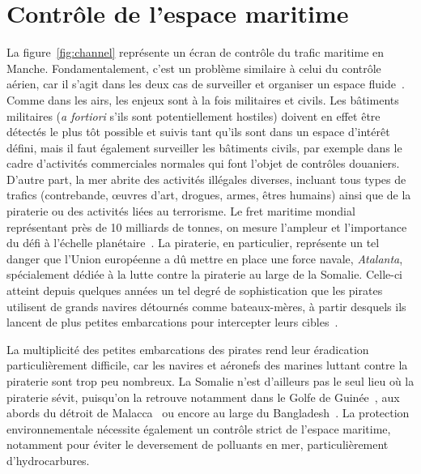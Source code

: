 \section{Contrôle de l'espace maritime}
	La figure~\ref{fig:channel} représente un écran de contrôle du trafic maritime en Manche. Fondamentalement, c'est un problème similaire à celui du contrôle aérien, car il s'agit dans les deux cas de surveiller et organiser un espace fluide~\cite{henninger2012avant, henninger2013fluide}. Comme dans les airs, les enjeux sont à la fois militaires et civils. Les bâtiments militaires (\emph{a fortiori} s'ils sont potentiellement hostiles) doivent en effet être détectés le plus tôt possible et suivis tant qu'ils sont dans un espace d'intérêt défini, mais il faut également surveiller les bâtiments civils, par exemple dans le cadre d'activités commerciales normales qui font l'objet de contrôles douaniers. D'autre part, la mer abrite des activités illégales diverses, incluant tous types de trafics (contrebande, œuvres d'art, drogues, armes, êtres humains) ainsi que de la piraterie ou des activités liées au terrorisme. Le fret maritime mondial représentant près de 10 milliards de tonnes, on mesure l'ampleur et l'importance du défi à l'échelle planétaire~\cite{unctad}. La piraterie, en particulier, représente un tel danger que l'Union européenne a dû mettre en place une force navale, \emph{Atalanta},\footnotemark{} spécialement dédiée à la lutte contre la piraterie au large de la Somalie. Celle-ci atteint depuis quelques années un tel degré de sophistication que les pirates utilisent de grands navires détournés comme bateaux-mères, à partir desquels ils lancent de plus petites embarcations pour intercepter leurs cibles~\cite{audebaud2010lutte, guisnel2012pirates, dumas2015}.
	
	
	La multiplicité des petites embarcations des pirates rend leur éradication particulièrement difficile, car les navires et aéronefs des marines luttant contre la piraterie sont trop peu nombreux.\footnotemark{} La Somalie n'est d'ailleurs pas le seul lieu où la piraterie sévit, puisqu'on la retrouve notamment dans le Golfe de Guinée~\cite{onuoha2012piracy}, aux abords du détroit de Malacca~\cite{raymond2009piracy} ou encore au large du Bangladesh~\cite{liss2011oceans}. La protection environnementale nécessite également un contrôle strict de l'espace maritime, notamment pour éviter le deversement de polluants en mer, particulièrement d'hydrocarbures.
	
